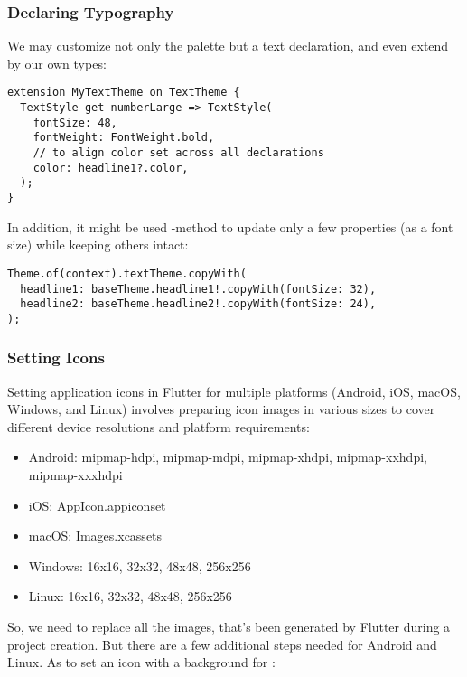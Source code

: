 \subsubsection{Declaring Typography}

We may customize not only the palette but a text declaration, and even extend  by our own types:

\begin{lstlisting}
extension MyTextTheme on TextTheme {
  TextStyle get numberLarge => TextStyle(
    fontSize: 48,
    fontWeight: FontWeight.bold,
    // to align color set across all declarations
    color: headline1?.color,
  );
}
\end{lstlisting}

\noindent In addition, it might be used -method to update only a few properties (as a font size) while 
keeping others intact: 

\begin{lstlisting}
Theme.of(context).textTheme.copyWith(
  headline1: baseTheme.headline1!.copyWith(fontSize: 32),
  headline2: baseTheme.headline2!.copyWith(fontSize: 24),
);
\end{lstlisting}


\subsubsection{Setting Icons}

Setting application icons in Flutter for multiple platforms (Android, iOS, macOS, Windows, and Linux) involves 
preparing icon images in various sizes to cover different device resolutions and platform requirements:

\begin{itemize}
  \item Android: mipmap-hdpi, mipmap-mdpi, mipmap-xhdpi, mipmap-xxhdpi, mipmap-xxxhdpi
  \item iOS: AppIcon.appiconset
  \item macOS: Images.xcassets
  \item Windows: 16x16, 32x32, 48x48, 256x256
  \item Linux: 16x16, 32x32, 48x48, 256x256
\end{itemize}

\noindent So, we need to replace all the images, that's been generated by Flutter during a project creation. But there 
are a few additional steps needed for Android and Linux. As to set an icon with a background for :

